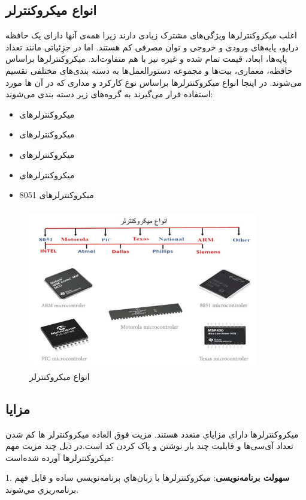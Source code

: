 \subsection{انواع میکروکنترلر}
اغلب میکروکنترلرها ویژگی‌های مشترک زیادی دارند زیرا همه‌ی آنها دارای یک حافظه درایو، پایه‌های ورودی و خروجی و توان مصرفی کم  هستند. اما در جزِئیاتی مانند تعداد پایه‌ها، ابعاد، قیمت تمام شده و غیره نیز با هم متفاوت‌اند.
میکروکنترلرها براساس حافظه، معماری، بیت‌ها و مجموعه دستورالعمل‌ها به دسته بندی‌های مختلفی تقسیم می‌شوند. در اینجا انواع میکروکنترلرها براساس نوع کارکرد و مداری که در آن ها مورد استفاده قرار می‌گیرند به گروه‌های زیر دسته بندی می‌شوند:
\begin{itemize}
\item
میکروکنترلرهای 
\item
میکروکنترلرهای  
\item
میکروکنترلرهای  
\item
میکروکنترلرهای  
\item
میکروکنترلرهای 8051
\end{itemize}

    \begin{figure}[!h]
	\centering
	\includegraphics[height=7cm,width=10cm]{./Images/CH3/Micro_Types.JPG}
	\caption[انواع میکروکنترلر]{انواع میکروکنترلر\cite{Micro}}
	\label{انواع میکرو}
	\end{figure}

\newpage
\subsection{مزایا}
ميكروكنترلرها داراي مزاياي متعدد هستند. مزیت فوق العاده میکروکنترلر ها کم شدن تعداد آی‌سی‌ها و قابلیت چند بار نوشتن و پاک کردن کد است.در ذیل چند مزیت مهم میکروکنترلرها آورده شده‌است:

1. \textbf{سهولت برنامه‌نویسی}: ميكروكنترلرها با زبان‌هاي برنامه‌نويسي ساده و قابل فهم برنامه‌ريزي مي‌شوند.

